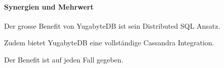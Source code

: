 \begin{flushleft}
    \paragraph{Synergien und Mehrwert}
    Der grosse Benefit von YugabyteDB ist sein Distributed SQL Ansatz.
\end{flushleft}
\begin{flushleft}
    Zudem bietet YugabyteDB eine vollständige \Gls{Cassandra} Integration.\\
\end{flushleft}
\begin{flushleft}
    Der Benefit ist auf jeden Fall gegeben.
\end{flushleft}


